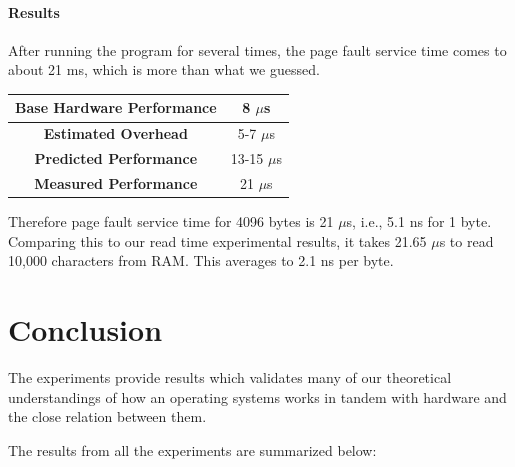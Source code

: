 \documentclass[conference]{IEEEtran}
\begin{document}
\paragraph{Results}

After running the program for several times, the page fault service time comes to about 21 ms, which is more than what we guessed.

\begin{center}
\begin{tabular}{ |c|c| } 
  \hline
  \textbf{Base Hardware Performance} & 8 $\mu$s \\ 
  \hline
  \textbf{Estimated Overhead} &  5-7 $\mu$s \\ 
  \hline
  \textbf{Predicted Performance} & 13-15 $\mu$s \\ 
  \hline
  \textbf{Measured Performance} & 21 $\mu$s \\ 
  \hline
\end{tabular}
\end{center}

Therefore page fault service time for 4096 bytes is 21 $\mu$s, i.e., 5.1 ns for 1 byte. Comparing this to our read time experimental results, it takes 21.65 $\mu$s to read 10,000 characters from RAM. This averages to 2.1 ns per byte.

\clearpage
\onecolumn
\section{Conclusion}

The experiments provide results which validates many of our theoretical understandings of how an operating systems works in tandem with hardware and the close relation between them.
\par The results from all the experiments are summarized below:\\
\end{document}
